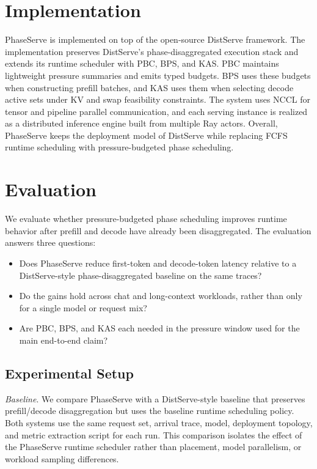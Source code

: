 \documentclass[lettersize,journal]{IEEEtran}
\begin{document}
\section{Implementation}\label{implementation}
PhaseServe is implemented on top of the open-source DistServe \cite{distserve} framework. The implementation preserves DistServe's phase-disaggregated execution stack and extends its runtime scheduler with PBC, BPS, and KAS. PBC maintains lightweight pressure summaries and emits typed budgets. BPS uses these budgets when constructing prefill batches, and KAS uses them when selecting decode active sets under KV and swap feasibility constraints. The system uses NCCL \cite{nccl} for tensor and pipeline parallel communication, and each serving instance is realized as a distributed inference engine built from multiple Ray \cite{ray} actors. Overall, PhaseServe keeps the deployment model of DistServe while replacing FCFS runtime scheduling with pressure-budgeted phase scheduling.

\section{Evaluation}\label{evaluation}

We evaluate whether pressure-budgeted phase scheduling improves runtime behavior after prefill and decode have already been disaggregated. The evaluation answers three questions:
\begin{itemize}
    \item Does PhaseServe reduce first-token and decode-token latency relative to a DistServe-style phase-disaggregated baseline on the same traces?
    \item Do the gains hold across chat and long-context workloads, rather than only for a single model or request mix?
    \item Are PBC, BPS, and KAS each needed in the pressure window used for the main end-to-end claim?
\end{itemize}

\subsection{Experimental Setup}

\textit{Baseline}. We compare PhaseServe with a DistServe-style baseline that preserves prefill/decode disaggregation but uses the baseline runtime scheduling policy. Both systems use the same request set, arrival trace, model, deployment topology, and metric extraction script for each run. This comparison isolates the effect of the PhaseServe runtime scheduler rather than placement, model parallelism, or workload sampling differences.
\end{document}
